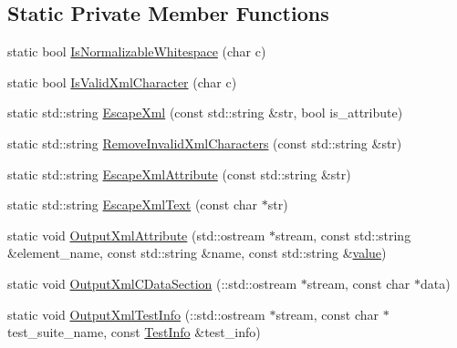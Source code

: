 \subsection*{Static Private Member Functions}
\begin{DoxyCompactItemize}
\item 
static bool \mbox{\hyperlink{classtesting_1_1internal_1_1_xml_unit_test_result_printer_af9d5af6e5d0c505d5c3bd50a8d2a8d76}{Is\+Normalizable\+Whitespace}} (char c)
\item 
static bool \mbox{\hyperlink{classtesting_1_1internal_1_1_xml_unit_test_result_printer_a2b83a24e3ec8544efa1156f9d6e51873}{Is\+Valid\+Xml\+Character}} (char c)
\item 
static std\+::string \mbox{\hyperlink{classtesting_1_1internal_1_1_xml_unit_test_result_printer_adadf42cf46ade9b26743466ce4b52f36}{Escape\+Xml}} (const std\+::string \&str, bool is\+\_\+attribute)
\item 
static std\+::string \mbox{\hyperlink{classtesting_1_1internal_1_1_xml_unit_test_result_printer_aa14cb72f42a346841482cbafa65e3155}{Remove\+Invalid\+Xml\+Characters}} (const std\+::string \&str)
\item 
static std\+::string \mbox{\hyperlink{classtesting_1_1internal_1_1_xml_unit_test_result_printer_aad574d7bb0c24578d5acc57817b9d367}{Escape\+Xml\+Attribute}} (const std\+::string \&str)
\item 
static std\+::string \mbox{\hyperlink{classtesting_1_1internal_1_1_xml_unit_test_result_printer_a934486bda28e7013f2d07520d5098a31}{Escape\+Xml\+Text}} (const char $\ast$str)
\item 
static void \mbox{\hyperlink{classtesting_1_1internal_1_1_xml_unit_test_result_printer_aa8ca7066de948d26d171597430c75839}{Output\+Xml\+Attribute}} (std\+::ostream $\ast$stream, const std\+::string \&element\+\_\+name, const std\+::string \&name, const std\+::string \&\mbox{\hyperlink{_obj__test_2lib_2googletest-master_2googlemock_2test_2gmock-matchers__test_8cc_a337b8a670efc0b086ad3af163f3121b6}{value}})
\item 
static void \mbox{\hyperlink{classtesting_1_1internal_1_1_xml_unit_test_result_printer_a41bccd75f54932c5b3b8cce1f94dbd54}{Output\+Xml\+C\+Data\+Section}} (\+::std\+::ostream $\ast$stream, const char $\ast$data)
\item 
static void \mbox{\hyperlink{classtesting_1_1internal_1_1_xml_unit_test_result_printer_aa7f900fe553777693d87bbdb9c76841b}{Output\+Xml\+Test\+Info}} (\+::std\+::ostream $\ast$stream, const char $\ast$test\+\_\+suite\+\_\+name, const \mbox{\hyperlink{classtesting_1_1_test_info}{Test\+Info}} \&test\+\_\+info)

\end{DoxyCompactItemize}
